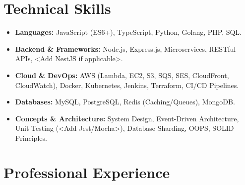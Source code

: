 \documentclass[11pt,a4paper]{article}
\begin{document}
\section{Technical Skills}
\begin{itemize}
    \item \textbf{Languages:} JavaScript (ES6+), TypeScript, Python, Golang, PHP, SQL.
    \item \textbf{Backend \& Frameworks:} Node.js, Express.js, Microservices, RESTful APIs, <Add NestJS if applicable>.
    \item \textbf{Cloud \& DevOps:} AWS (Lambda, EC2, S3, SQS, SES, CloudFront, CloudWatch), Docker, Kubernetes, Jenkins, Terraform, CI/CD Pipelines.
    \item \textbf{Databases:} MySQL, PostgreSQL, Redis (Caching/Queues), MongoDB.
    \item \textbf{Concepts \& Architecture:} System Design, Event-Driven Architecture, Unit Testing (<Add Jest/Mocha>), Database Sharding, OOPS, SOLID Principles.
\end{itemize}

\section{Professional Experience}
\end{document}
